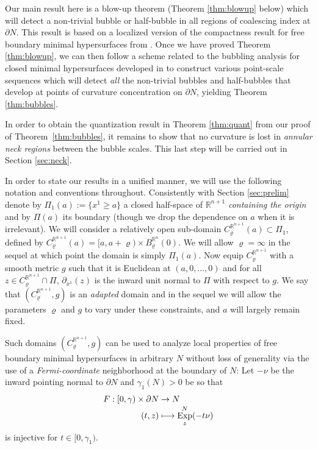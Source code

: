 \documentclass[JEP,XML,SOM,Unicode]{cedram}
\newcommand{\mto}{\mathchoice{\longmapsto}{\mapsto}{\mapsto}{\mapsto}}
\DeclareMathOperator{\Exp}{Exp}
\theoremstyle{definition}
\newcommand{\R}{\mathbb{R}}
\begin{document}
Our main result here is a blow-up theorem (Theorem \ref{thm:blowup} below) which will detect a non-trivial bubble or half-bubble in all regions of coalescing index at $\partial N$.
This result is based on a localized version of the compactness result for free boundary minimal hypersurfaces from \cite{ACS17}. Once we have proved Theorem \ref{thm:blowup}, we can then follow a scheme related to the bubbling analysis for closed minimal hypersurfaces developed in \cite[\S3]{BS17} to construct various point-scale sequences which will detect \emph{all} the non-trivial bubbles and half-bubbles that develop at points of curvature concentration on $\partial N$, yielding Theorem \ref{thm:bubbles}.

In order to obtain the quantization result in Theorem \ref{thm:quant} from our proof of Theorem~\ref{thm:bubbles}, it remains to show that no curvature is lost in \emph{annular neck regions} between the bubble scales. This last step will be carried out in Section \ref{sec:neck}.

In order to state our results in a unified manner, we will use the following notation and conventions throughout. Consistently with Section \ref{sec:prelim} denote by $\Pi_1(a):=\{x^1\geq a\}$ a closed half-space of $\R^{n+1}$ \emph{containing the origin} and by $\Pi(a)$ its boundary (though we drop the dependence on $a$ when it is irrelevant). We will consider a relatively open sub-domain $C^{\R^{n+1}}_\varrho(a)\subset \Pi_1$, defined by $C^{\R^{n+1}}_\varrho(a)=[a,a+\varrho)\times B^{\R^n}_\varrho (0)$. We will allow $\varrho=\infty$ in the sequel at which point the domain is simply $\Pi_1(a)$. Now equip $C^{\R^{n+1}}_\varrho$ with a smooth metric $g$ such that it is Euclidean at $(a,0,\dots,0)$ and for all $z\in C^{\R^{n+1}}_\varrho\cap \Pi$, $\partial_{x^1}(z)$ is the inward unit normal to $\Pi$ with respect to $g$. We say that $(C^{\R^{n+1}}_\varrho,g)$ is an \emph{adapted} domain and in the sequel we will allow the parameters $\varrho$ and $g$ to vary under these constraints, and $a$ will largely remain fixed.

Such domains $(C^{\R^{n+1}}_\varrho,g)$ can be used to analyze local properties of free boundary minimal hypersurfaces in arbitrary $N$ without loss of generality via the use of
a \emph{Fermi-coordinate} neighborhood at the boundary of $N$:
Let $-\nu$ be the inward pointing normal to $\partial N$ and $\gamma_1(N)>0$ be so that
\begin{align*}
F:[0,\gamma)\times \partial N &\to N\\[-3pt]
(t,z)&\mto \Exp^N_z (-t\nu)
\end{align*}
is injective for $t\in [0,\gamma_1)$.
\end{document}
